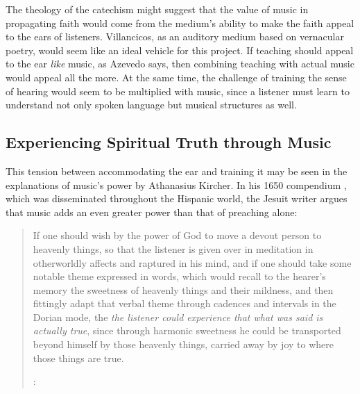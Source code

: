 The theology of the catechism might suggest that the value of music in propagating faith would come from the medium's ability to make the faith appeal to the ears of listeners.
Villancicos, as an auditory medium based on vernacular poetry, would seem like an ideal vehicle for this project.
If teaching should appeal to the ear \emph{like} music, as Azevedo says, then combining teaching with actual music would appeal all the more.
At the same time, the challenge of training the sense of hearing would seem to be multiplied with music, since a listener must learn to understand not only spoken language but musical structures as well.

\subsection{Experiencing Spiritual Truth through Music}

This tension between accommodating the ear and training it may be seen in the explanations of music's power by Athanasius Kircher.
In his 1650 compendium , which was disseminated throughout the Hispanic world, the Jesuit writer argues that music adds an even greater power than that of preaching alone:
\begin{quote}
  If one should wish by the power of God to move a devout person to heavenly things, so that the listener is given over in meditation in otherworldly affects and raptured in his mind,
  and if one should take some notable theme expressed in words,
  which would recall to the hearer's memory the sweetness of heavenly things and their mildness,
  and then fittingly adapt that verbal theme through cadences and intervals in the Dorian mode,
  the \emph{the listener could experience that what was said is actually true}, 
  since through harmonic sweetness he could be transported beyond himself by those heavenly things,
  carried away by joy to where those things are true.%
  \begin{Footnote}
    \Autocite[bk.\~7, 550 (emphasis added)]{Kircher:Musurgia}:
  \end{Footnote}
\end{quote}

